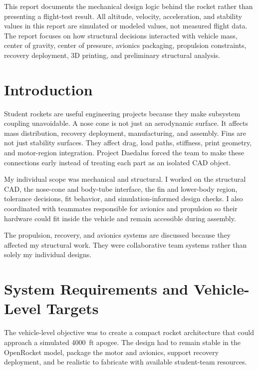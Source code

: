 \documentclass[11pt]{article}
\begin{document}
This report documents the mechanical design logic behind the rocket rather than presenting a flight-test result. All altitude, velocity, acceleration, and stability values in this report are simulated or modeled values, not measured flight data. The report focuses on how structural decisions interacted with vehicle mass, center of gravity, center of pressure, avionics packaging, propulsion constraints, recovery deployment, 3D printing, and preliminary structural analysis.

\section{Introduction}
Student rockets are useful engineering projects because they make subsystem coupling unavoidable. A nose cone is not just an aerodynamic surface. It affects mass distribution, recovery deployment, manufacturing, and assembly. Fins are not just stability surfaces. They affect drag, load paths, stiffness, print geometry, and motor-region integration. Project Daedalus forced the team to make these connections early instead of treating each part as an isolated CAD object.

My individual scope was mechanical and structural. I worked on the structural CAD, the nose-cone and body-tube interface, the fin and lower-body region, tolerance decisions, fit behavior, and simulation-informed design checks. I also coordinated with teammates responsible for avionics and propulsion so their hardware could fit inside the vehicle and remain accessible during assembly.

The propulsion, recovery, and avionics systems are discussed because they affected my structural work. They were collaborative team systems rather than solely my individual designs.

\section{System Requirements and Vehicle-Level Targets}
The vehicle-level objective was to create a compact rocket architecture that could approach a simulated \SI{4000}{ft} apogee. The design had to remain stable in the OpenRocket model, package the motor and avionics, support recovery deployment, and be realistic to fabricate with available student-team resources.
\end{document}
